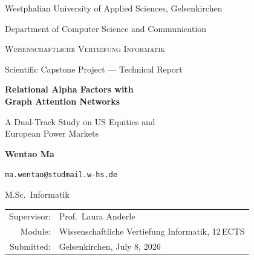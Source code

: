 \begin{titlepage}
  \centering

  \vspace*{2em}
  {\large Westphalian University of Applied Sciences, Gelsenkirchen\par}
  \vspace{0.35em}
  {\normalsize Department of Computer Science and Communication\par}

  \vspace{3.2em}
  {\scshape\large Wissenschaftliche Vertiefung Informatik\par}
  \vspace{0.3em}
  {\normalsize Scientific Capstone Project --- Technical Report\par}

  \vspace{5em}
  {\sffamily\bfseries\huge Relational Alpha Factors with\\[0.4em]
  Graph Attention Networks\par}
  \vspace{1.2em}
  {\sffamily\large A Dual-Track Study on US Equities and\\[0.2em]
  European Power Markets\par}

  \vspace{5em}
  {\Large\bfseries Wentao Ma\par}
  \vspace{0.4em}
  {\normalsize\texttt{ma.wentao@studmail.w-hs.de}\par}
  \vspace{0.25em}
  {\normalsize M.Sc.\ Informatik\par}

  \vfill

  {\normalsize
  \begin{tabular}{@{}rl@{}}
    Supervisor: & Prof.\ Laura Anderle\\[0.25em]
    Module:     & Wissenschaftliche Vertiefung Informatik, 12\,ECTS\\[0.25em]
    Submitted:  & Gelsenkirchen, July 8, 2026\\
  \end{tabular}\par}

  \vspace{1.5em}
\end{titlepage}
